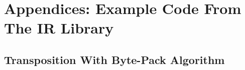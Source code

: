 
%
%

\chapter{Appendices: Example Code From The IR Library}\label{app:one}

\section{Transposition With Byte-Pack Algorithm}
\label{appone:transposition}


